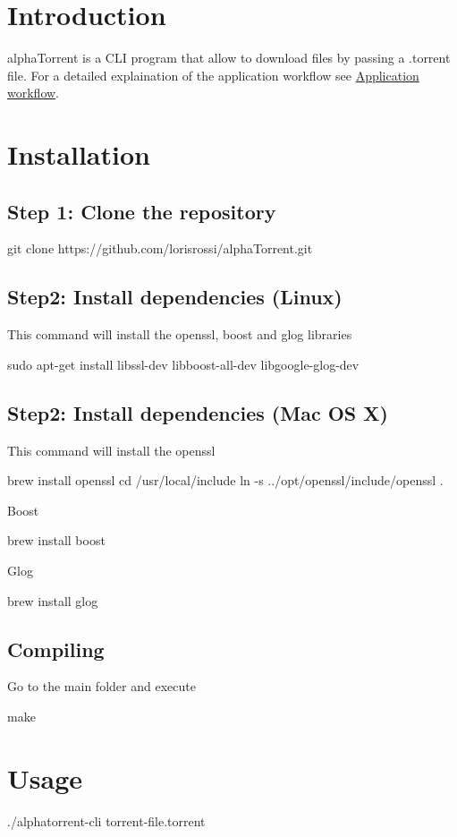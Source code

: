 \hypertarget{index_intro_sec}{}\section{Introduction}\label{index_intro_sec}
alpha\+Torrent is a C\+LI program that allow to download files by passing a .torrent file. For a detailed explaination of the application workflow see \hyperlink{workflow}{Application workflow}. \hypertarget{index_install_sec}{}\section{Installation}\label{index_install_sec}
\hypertarget{index_step1}{}\subsection{Step 1\+: Clone the repository}\label{index_step1}

\begin{DoxyCode}
git clone https:\textcolor{comment}{//github.com/lorisrossi/alphaTorrent.git}
\end{DoxyCode}
\hypertarget{index_step21}{}\subsection{Step2\+: Install dependencies (\+Linux)}\label{index_step21}
This command will install the openssl, boost and glog libraries 
\begin{DoxyCode}
sudo apt-\textcolor{keyword}{get} install libssl-dev libboost-all-dev libgoogle-glog-dev
\end{DoxyCode}
\hypertarget{index_step22}{}\subsection{Step2\+: Install dependencies (\+Mac O\+S X)}\label{index_step22}
This command will install the openssl 
\begin{DoxyCode}
brew install openssl
cd /usr/local/include
ln -s ../opt/openssl/include/openssl .
\end{DoxyCode}
 Boost 
\begin{DoxyCode}
brew install boost
\end{DoxyCode}
 Glog 
\begin{DoxyCode}
brew install glog
\end{DoxyCode}
\hypertarget{index_compiling}{}\subsection{Compiling}\label{index_compiling}
Go to the main folder and execute 
\begin{DoxyCode}
make
\end{DoxyCode}
\hypertarget{index_usage}{}\section{Usage}\label{index_usage}

\begin{DoxyCode}
./alphatorrent-cli torrent-file.torrent
\end{DoxyCode}
 